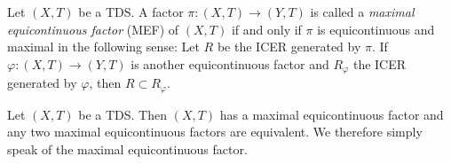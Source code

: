 \begin{definition}
  Let $(X,T)$ be a TDS.
  A factor $\pi : (X,T) \to (Y,T)$ is called a \emph{maximal equicontinuous factor} (MEF) of $(X,T)$ if and only if $\pi$ is equicontinuous and maximal in the following sense:
  Let $R$ be the ICER generated by $\pi$.
  If $\varphi : (X,T) \to (Y,T)$ is another equicontinuous factor and $R_\varphi$ the ICER generated by $\varphi$, then $R \subset R_\varphi$.
\end{definition}
\begin{theorem}
  Let $(X,T)$ be a TDS.
  Then $(X,T)$ has a maximal equicontinuous factor and any two maximal equicontinuous factors are equivalent.
  We therefore simply speak of the maximal equicontinuous factor.
  \end{theorem}

